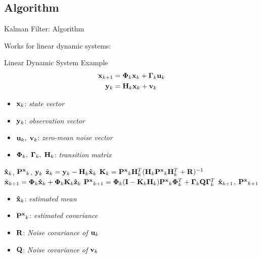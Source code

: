 \subsection{Algorithm}
\begin{frame}[allowframebreaks]{Kalman Filter: Algorithm}  %

Works for linear dynamic systems:
\begin{block}{Linear Dynamic System Example}
\begin{align*}
{\bf x}_{k+1} &= {\bf \Phi}_k{\bf x}_{k} + {\bf \Gamma}_k{\bf u}_{k}\notag\\
{\bf y}_{k} &= {\bf H}_k{\bf x}_{k} + {\bf v}_{k}
\end{align*}   
\begin{itemize}
    \item ${\bf x}_k$: {\it state vector}
    \item ${\bf y}_k$: {\it observation vector}
    \item ${\bf u}_k,\; {\bf v}_k$: {\it zero-mean noise vector}
    \item ${\bf \Phi}_k, \; {\bf \Gamma}_k, \; {\bf H}_k$: {\it transition matrix}
\end{itemize}
\end{block}

\pause

\begin{algorithm}[H]
\caption{Classic Kalman Filter}
\begin{algorithmic}[1]
\REQUIRE ${\bf \hat x}_k$, ${\bf P^x}_{k}$, ${\bf y}_k$
\STATE $\tilde {\bf z}_k = {\bf y}_k - {\bf H}_k{\bf \hat x}_k$
\STATE ${\bf K}_k = {\bf P^x}_k{\bf H}^T_k({\bf H}_k{\bf P^x}_k{\bf H}^T_k+{\bf R})^{-1}$
\STATE $\hat{\bf x}_{k+1} = {\bf \Phi}_k{\bf \hat x}_k+{\bf \Phi}_k{\bf K}_k{\bf \tilde z}_k$
\STATE ${\bf P^x}_{k+1} = {\bf \Phi}_k({\bf I}-{\bf K}_k{\bf H}_k){\bf P^x}_k{\bf \Phi}^T_k + {\bf \Gamma}_k{\bf Q}{\bf \Gamma}_k^T$
\ENSURE ${\bf \hat x}_{k+1}$, ${\bf P^x}_{k+1}$
\end{algorithmic}
\end{algorithm}

\begin{itemize}
    \item ${\bf \hat x}_k$: {\it estimated mean}
    \item ${\bf P^x}_k$: {\it estimated covariance}
    \item ${\bf R}$: {\it Noise covariance of ${\bf u}_k$}
    \item ${\bf Q}$: {\it Noise covariance of ${\bf v}_k$}
\end{itemize}
\end{frame}


